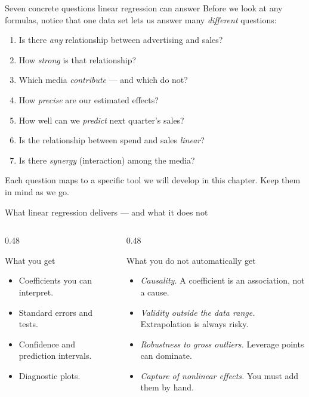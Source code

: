 \documentclass[aspectratio=169,11pt]{beamer}
\begin{document}
\begin{frame}{Seven concrete questions linear regression can answer}
  Before we look at any formulas, notice that one data set lets us
  answer many \emph{different} questions:
  \begin{enumerate}
    \item Is there \emph{any} relationship between advertising and
          sales?
    \item How \emph{strong} is that relationship?
    \item Which media \emph{contribute} --- and which do not?
    \item How \emph{precise} are our estimated effects?
    \item How well can we \emph{predict} next quarter's sales?
    \item Is the relationship between spend and sales \emph{linear}?
    \item Is there \emph{synergy} (interaction) among the media?
  \end{enumerate}
  Each question maps to a specific tool we will develop in this
  chapter. Keep them in mind as we go.
\end{frame}

\begin{frame}{What linear regression delivers --- and what it does not}
  \begin{columns}[T]
    \begin{column}{0.48\textwidth}
      \begin{block}{What you get}
        \begin{itemize}
          \item Coefficients you can interpret.
          \item Standard errors and tests.
          \item Confidence and prediction intervals.
          \item Diagnostic plots.
        \end{itemize}
      \end{block}
    \end{column}
    \begin{column}{0.48\textwidth}
      \begin{alertblock}{What you do not automatically get}
        \begin{itemize}
          \item \emph{Causality.} A coefficient is an association, not
                a cause.
          \item \emph{Validity outside the data range.} Extrapolation is
                always risky.
          \item \emph{Robustness to gross outliers.} Leverage points
                can dominate.
          \item \emph{Capture of nonlinear effects.} You must add
                them by hand.
        \end{itemize}
      \end{alertblock}
    \end{column}
  \end{columns}
\end{frame}
\end{document}
